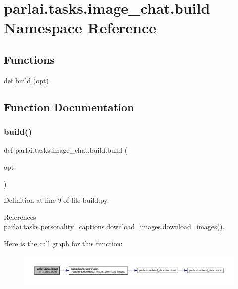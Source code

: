 \hypertarget{namespaceparlai_1_1tasks_1_1image__chat_1_1build}{}\section{parlai.\+tasks.\+image\+\_\+chat.\+build Namespace Reference}
\label{namespaceparlai_1_1tasks_1_1image__chat_1_1build}
\subsection*{Functions}
\begin{DoxyCompactItemize}
\item 
def \hyperlink{namespaceparlai_1_1tasks_1_1image__chat_1_1build_a82355284c67a174d8c8a730a4a819906}{build} (opt)
\end{DoxyCompactItemize}


\subsection{Function Documentation}
\mbox{\label{namespaceparlai_1_1tasks_1_1image__chat_1_1build_a82355284c67a174d8c8a730a4a819906}} 
\subsubsection{\texorpdfstring{build()}{build()}}
{\footnotesize\ttfamily def parlai.\+tasks.\+image\+\_\+chat.\+build.\+build (\begin{DoxyParamCaption}\item[{}]{opt }\end{DoxyParamCaption})}



Definition at line 9 of file build.\+py.



References parlai.\+tasks.\+personality\+\_\+captions.\+download\+\_\+images.\+download\+\_\+images().

Here is the call graph for this function\+:
\nopagebreak
\begin{figure}[H]
\begin{center}
\leavevmode
\includegraphics[width=350pt]{namespaceparlai_1_1tasks_1_1image__chat_1_1build_a82355284c67a174d8c8a730a4a819906_cgraph}
\end{center}
\end{figure}
